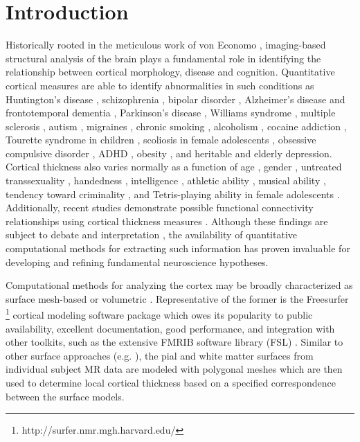 \section{Introduction}

Historically rooted in the meticulous work of von Economo \citep{economo2008},
imaging-based structural analysis of the brain plays a fundamental role
in identifying the relationship between cortical morphology, disease and cognition.
Quantitative cortical measures are able to identify abnormalities in such conditions as 
Huntington's disease \citep{rosas2002,rosas2005,selemon2004}, 
schizophrenia \citep{nesvag2008}, bipolar disorder \cite{lyoo2006}, Alzheimer's disease and frontotemporal
dementia \citep{du2007,dickerson2009}, Parkinson's disease \citep{jubault2011}, Williams syndrome \cite{thompson2005},
multiple sclerosis \citep{ramasamy2009}, autism \citep{chung2005,hardan2006},
migraines \citep{dasilva2007}, chronic smoking \citep{kuhn2010}, alcoholism \citep{fortier2011},
cocaine addiction \citep{makris2008}, Tourette syndrome in children \citep{sowell2008},
scoliosis in
female adolescents \citep{wang2012}, obsessive compulsive
disorder \citep{shin2007}, ADHD \citep{almeida-montes2012}, obesity \citep{raji2010}, and heritable \citep{peterson2009}
and elderly \citep{ballmaier2004} depression.  Cortical thickness also
varies normally as a function of age \citep{kochunov2011},
gender \citep{luders2006a}, untreated transsexuality \citep{zubiaurre-elorza2012},  handedness
\citep{luders2006,amunts2007}, intelligence \citep{shaw2006}, athletic
ability \citep{wei2011}, musical ability \citep{bermudez2009,foster2010}, 
tendency toward criminality \citep{raine2011}, and Tetris-playing
ability in female adolescents \citep{haier2009}.  Additionally,
recent studies demonstrate possible functional 
connectivity relationships using cortical thickness measures
\cite{worsley2005,lerch2006,he2007}.
Although these findings
are subject to debate and interpretation \citep{gernsbacher2007}, 
the availability of quantitative
computational methods for extracting such information
has proven invaluable for developing and refining fundamental 
neuroscience hypotheses.

Computational methods for analyzing the cortex may be 
broadly characterized as surface mesh-based or volumetric \citep{scott2009,clarkson2011}.  Representative of the former is the
Freesurfer%
\footnote{
http://surfer.nmr.mgh.harvard.edu/
}
cortical modeling software package \citep{dale1999,fischl1999,fischl2000,fischl2002,fischl2004}
which owes its popularity to public availability, excellent documentation, 
good performance, and  integration with other toolkits, such as the extensive FMRIB software 
library (FSL) \citep{smith2004}.  Similar to other surface
approaches (e.g. \cite{davatzikos1996,magnotta1999,macdonald2000,kim2005}), the pial
and white matter surfaces from individual subject MR data are modeled with polygonal meshes  
which are then used to determine local cortical thickness based on a specified correspondence between 
the surface models.

